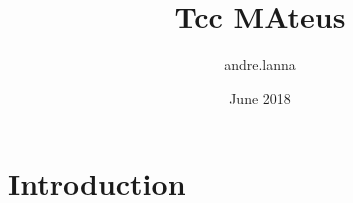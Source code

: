 \documentclass{article}
\title{Tcc MAteus}
\author{andre.lanna }
\date{June 2018}
\begin{document}
\maketitle

\section{Introduction}
\end{document}
